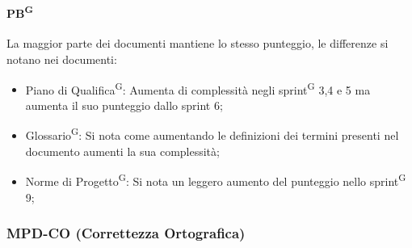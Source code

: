 \documentclass[5pt]{article}
\begin{document}
	\paragraph{PB\textsuperscript{G}} La maggior parte dei documenti mantiene lo stesso punteggio, le differenze si notano nei documenti: 
	\begin{itemize}
		\item Piano di Qualifica\textsuperscript{G}: Aumenta di complessità negli sprint\textsuperscript{G} 3,4 e 5 ma aumenta il suo punteggio dallo sprint 6;
		\item Glossario\textsuperscript{G}: Si nota come aumentando le definizioni dei termini presenti nel documento aumenti la sua complessità;
		\item Norme di Progetto\textsuperscript{G}: Si nota un leggero aumento del punteggio nello sprint\textsuperscript{G} 9;
	\end{itemize}
	
	\subsubsection{MPD-CO (Correttezza Ortografica)}
	
\end{document}
